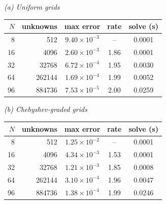 \textit{(a) Uniform grids}\\[2pt]
\begin{tabular}{rr cc c}
\toprule
$N$ & unknowns & max error & rate & solve (s)\\
\midrule
8 & 512 & $9.40{\times}10^{-3}$ & -- & 0.0001\\
16 & 4096 & $2.60{\times}10^{-3}$ & 1.86 & 0.0001\\
32 & 32768 & $6.72{\times}10^{-4}$ & 1.95 & 0.0030\\
64 & 262144 & $1.69{\times}10^{-4}$ & 1.99 & 0.0052\\
96 & 884736 & $7.53{\times}10^{-5}$ & 2.00 & 0.0259\\
\bottomrule
\end{tabular}

\medskip
\textit{(b) Chebyshev-graded grids}\\[2pt]
\begin{tabular}{rr cc c}
\toprule
$N$ & unknowns & max error & rate & solve (s)\\
\midrule
8 & 512 & $1.25{\times}10^{-2}$ & -- & 0.0001\\
16 & 4096 & $4.34{\times}10^{-3}$ & 1.53 & 0.0001\\
32 & 32768 & $1.21{\times}10^{-3}$ & 1.85 & 0.0008\\
64 & 262144 & $3.10{\times}10^{-4}$ & 1.96 & 0.0047\\
96 & 884736 & $1.38{\times}10^{-4}$ & 1.99 & 0.0246\\
\bottomrule
\end{tabular}

